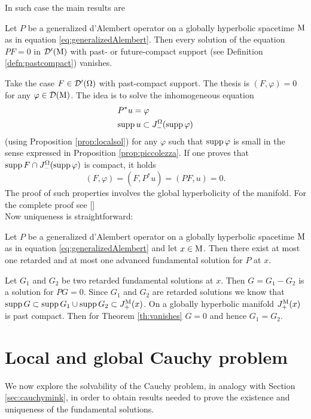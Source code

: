 \noindent In such case the main results are

\begin{theorem}
	Let $P$ be a generalized d'Alembert operator on a globally hyperbolic spacetime $\mathrm{M}$ as in equation \eqref{eq:generalizedAlembert}. Then every solution of the equation $PF=0$ in $\mathcal{D}'(\mathrm{M})$ with past- or future-compact support (see Definition \ref{defn:pastcompact}) vanishes.
	\label{th:vanishes}
	
\end{theorem}
\Proofsketch Take the case $F\in\mathcal{D}'(\Omega)$ with past-compact support. The thesis is $(F,\varphi)=0$ for any $\varphi\in\mathcal{D}(\mathrm{M})$. The idea is to solve the inhomogeneous equation
	\[	\begin{aligned}
&P^*u=\varphi\\
&\text{supp}\,u\subset J_-^\Omega(\text{supp}\,\varphi)
\end{aligned}		\]
(using Proposition \ref{prop:localsol}) for any $\varphi$ such that $\text{supp}\,\varphi$ is small in the sense expressed in Proposition \ref{prop:piccolezza}. If one proves that $\text{supp}\, F\cap J_-^\Omega(\text{supp}\,\varphi)$ is compact, it holds
\[	(F,\varphi)=(F,P^*u)=(PF,u)=0.		\]
The proof of such properties involves the global hyperbolicity of the manifold. For the complete proof see [\citealp[Sec 2.3]{bar2}]\endproof\\

\noindent Now uniqueness is straightforward:
\begin{cor}
	Let $P$ be a generalized d'Alembert operator on a globally hyperbolic spacetime $\mathrm{M}$ as in equation \eqref{eq:generalizedAlembert} and let $x\in\mathrm{M}$. Then there exist at most one retarded and at most one advanced fundamental solution for $P$ at $x$.
	\label{cor:uniquenessfundamental}
\end{cor}
\Proof Let $G_1$ and $G_2$ be two retarded fundamental solutions at $x$. Then $G = G_1-G_2$ is a solution for $PG = 0$. Since $G_1$ and $G_2$ are retarded solutions we know that $\text{supp}\, G\subset \text{supp}\,G_1 \cup \text{supp}\,G_2 \subset J_+^{\mathrm{M}} (x)$. On a globally hyperbolic manifold $J_+^{\mathrm{M}} (x)$ is past compact. Then for Theorem \ref{th:vanishes} $G=0$ and hence $G_1=G_2$.\endproof

\section{Local and global Cauchy problem}
\label{sec:globalCauchy}
We now explore the solvability of the Cauchy problem, in analogy with Section \ref{sec:cauchymink}, in order to obtain results needed to prove the existence and uniqueness of the fundamental solutions.


